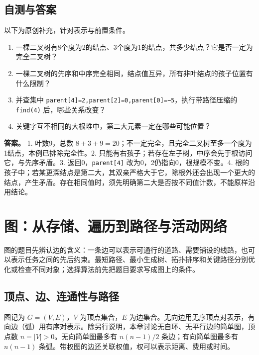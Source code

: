 \section{自测与答案}\label{ds-ch5-check}

以下为原创补充，针对表示与前置条件。

\begin{enumerate}
\def\labelenumi{\arabic{enumi}.}
\tightlist
\item
  一棵二叉树有8个度为2的结点、3个度为1的结点，共多少结点？它是否一定为完全二叉树？
\item
  一棵二叉树的先序和中序完全相同，结点值互异，所有非叶结点的孩子位置有什么限制？
\item
  并查集中 \allowbreak{}\texttt{parent{[}4{]}=2,}\allowbreak{}\texttt{parent{[}2{]}=0,}\allowbreak{}\texttt{parent{[}0{]}=−5}，执行带路径压缩的 \allowbreak{}\texttt{find(4)} 后，哪些关系改变？
\item
  关键字互不相同的大根堆中，第二大元素一定在哪些可能位置？
\end{enumerate}

\textbf{答案。} 1. 叶数9，总数 \(8+3+9=20\)；不一定完全，且完全二叉树至多一个度为1结点，本例已排除完全性。2. 只能有右孩子；若存在左子树，中序会先于根访问它，与先序矛盾。3. 返回0，\allowbreak{}\texttt{parent{[}4{]}} 改为0，2仍指向0，根规模不变。4. 根的孩子中；若某更深结点是第二大，其双亲严格大于它，除根外还会出现一个更大的结点，产生矛盾。存在相同值时，须先明确第二大是否按不同值计数，不能原样沿用结论。

\chapter{图：从存储、遍历到路径与活动网络}\label{ds-ch6}

图的题目先辨认边的含义：一条边可以表示可通行的道路、需要铺设的线路，也可以表示任务之间的先后约束。最短路径、最小生成树、拓扑排序和关键路径分别优化或检查不同对象；选择算法前先把题目要求写成图上的条件。

\section{顶点、边、连通性与路径}\label{ds-06-01}

图记为 \(G=(V,E)\)，\(V\) 为顶点集合，\(E\) 为边集合。无向边用无序顶点对表示，有向边（弧）用有序对表示。除另行说明，本章讨论无自环、无平行边的简单图，顶点数 \(n=|V|>0\)。无向简单图最多有 \(n(n-1)/2\) 条边；有向简单图最多有 \(n(n-1)\) 条弧。带权图的边还关联权值，权可以表示距离、费用或时间。

